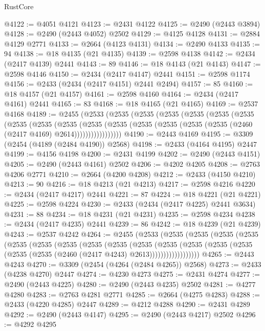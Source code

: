 \begin{lexlean}{RustCore}
\begin{coremodule}
@4122 := @4051 @4121
@4123 := @2431 @4122
@4125 := @2490 (@2443 @3894)
@4128 := @2490 (@2443 @4052) @2502
@4129 := @4125 @4128
@4131 := @2884 @4129 @2771
@4133 := @2664 (@4123 @4131)
@4134 := @2490 @4133
@4135 := 94
@4138 := @18 @4135 (@21 @4135)
@4139 := @2598 @4138
@4142 := @2434 (@2417 @4139) @2441
@4143 := 89
@4146 := @18 @4143 (@21 @4143)
@4147 := @2598 @4146
@4150 := @2434 (@2417 @4147) @2441
@4151 := @2598 @1174
@4156 := @2433 (@2434 (@2417 @4151) @2441 @2494)
@4157 := 85
@4160 := @18 @4157 (@21 @4157)
@4161 := @2598 @4160
@4164 := @2434 (@2417 @4161) @2441
@4165 := 83
@4168 := @18 @4165 (@21 @4165)
@4169 := @2537 @4168
@4189 := @2455
    (@2533
      (@2535
        (@2535
          (@2535
            (@2535
              (@2535
                (@2535
                  (@2535
                    (@2535
                      (@2535
                        (@2535
                          (@2535
                            (@2535 (@2535 (@2535 (@2535 (@2460 (@2417 @4169) @2614)))))))))))))))))
@4190 := @2443 @4169
@4195 := @3309 (@2454 (@4189 (@2484 @4190)) @2568)
@4198 := @2433 (@4164 @4195) @2447
@4199 := @4156 @4198
@4200 := @2431 @4199
@4202 := @2490 (@2443 @4151)
@4205 := @2490 (@2443 @4161) @2502
@4206 := @4202 @4205
@4208 := @2763 @4206 @2771
@4210 := @2664 (@4200 @4208)
@4212 := @2433 (@4150 @4210)
@4213 := 90
@4216 := @18 @4213 (@21 @4213)
@4217 := @2598 @4216
@4220 := @2434 (@2417 @4217) @2441
@4221 := 87
@4224 := @18 @4221 (@21 @4221)
@4225 := @2598 @4224
@4230 := @2433 (@2434 (@2417 @4225) @2441 @3634)
@4231 := 88
@4234 := @18 @4231 (@21 @4231)
@4235 := @2598 @4234
@4238 := @2434 (@2417 @4235) @2441
@4239 := 86
@4242 := @18 @4239 (@21 @4239)
@4243 := @2537 @4242
@4264 := @2455
    (@2533
      (@2535
        (@2535
          (@2535
            (@2535
              (@2535
                (@2535
                  (@2535
                    (@2535
                      (@2535
                        (@2535
                          (@2535
                            (@2535
                              (@2535
                                (@2535 (@2535 (@2535 (@2460 (@2417 @4243) @2613))))))))))))))))))
@4265 := @2443 @4243
@4270 := @3309 (@2454 (@4264 (@2484 @4265)) @2568)
@4273 := @2433 (@4238 @4270) @2447
@4274 := @4230 @4273
@4275 := @2431 @4274
@4277 := @2490 (@2443 @4225)
@4280 := @2490 (@2443 @4235) @2502
@4281 := @4277 @4280
@4283 := @2763 @4281 @2771
@4285 := @2664 (@4275 @4283)
@4288 := @2433 (@4220 @4285) @2447
@4289 := @4212 @4288
@4290 := @2431 @4289
@4292 := @2490 (@2443 @4147)
@4295 := @2490 (@2443 @4217) @2502
@4296 := @4292 @4295

\end{coremodule}
\end{lexlean}
